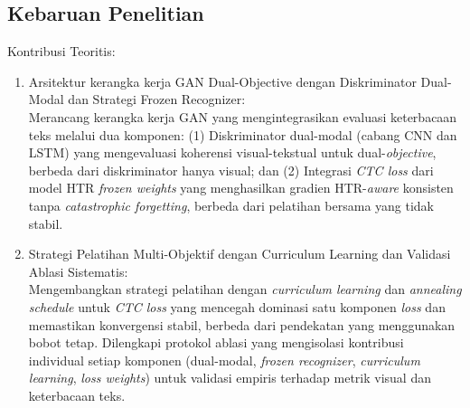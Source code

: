 \documentclass[12pt,a4paper]{article}
\begin{document}


\vspace{0.8em}
\subsection{Kebaruan Penelitian}
\label{subsec:kebaruan}

Kontribusi Teoritis:
\begin{enumerate}[label=\arabic*., leftmargin=1cm]
    \item Arsitektur kerangka kerja GAN Dual-Objective dengan Diskriminator Dual-Modal dan Strategi Frozen Recognizer: \\
    Merancang kerangka kerja GAN yang mengintegrasikan evaluasi keterbacaan teks melalui dua komponen: (1) Diskriminator dual-modal (cabang CNN dan LSTM) yang mengevaluasi koherensi visual-tekstual untuk dual-\textit{objective}, berbeda dari diskriminator hanya visual; dan (2) Integrasi \textit{CTC loss} dari model HTR \textit{frozen weights} yang menghasilkan gradien HTR-\textit{aware} konsisten tanpa \textit{catastrophic forgetting}, berbeda dari pelatihan bersama yang tidak stabil.

    \item Strategi Pelatihan Multi-Objektif dengan Curriculum Learning dan Validasi Ablasi Sistematis: \\
    Mengembangkan strategi pelatihan dengan \textit{curriculum learning} dan \textit{annealing schedule} untuk \textit{CTC loss} yang mencegah dominasi satu komponen \textit{loss} dan memastikan konvergensi stabil, berbeda dari pendekatan yang menggunakan bobot tetap. Dilengkapi protokol ablasi yang mengisolasi kontribusi individual setiap komponen (dual-modal, \textit{frozen recognizer}, \textit{curriculum learning}, \textit{loss weights}) untuk validasi empiris terhadap metrik visual dan keterbacaan teks.


\end{enumerate}
\end{document}
